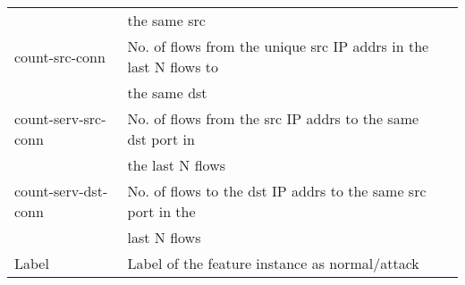 {\begin{tabular}{llr}
		& the same src \\
		count-src-conn &  No. of flows from the unique src IP addrs in the last N flows to  \\
		&the same dst \\
		count-serv-src-conn &  No. of flows from the src IP addrs to the same dst port in  \\
		&the last N flows \\
		count-serv-dst-conn &  No. of flows to the dst IP addrs to the same src port in the \\
		& last N flows \\
		Label & Label of the feature instance as normal/attack  \\
		\hline
	\end{tabular}
}


